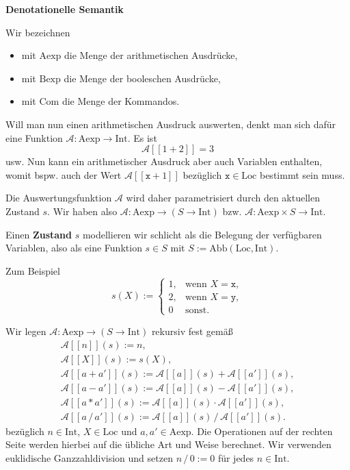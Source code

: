 \documentclass[8pt,fleqn,aspectratio=169]{beamer}
\newcommand{\strong}[1]{\textsf{\textbf{#1}}}
\newcommand{\centerheadline}[1]{%
  \begin{center}\strong{#1}\end{center}}
\newcommand{\parspace}{\vspace{0.8em}}
\newcommand{\code}[1]{{\texttt{#1}}}
\newcommand{\qb}[1]{[\!\![#1]\!\!]}
\newcommand{\Int}{\mathrm{Int}}
\newcommand{\Loc}{\mathrm{Loc}}
\newcommand{\Aexp}{\mathrm{Aexp}}
\newcommand{\Bexp}{\mathrm{Bexp}}
\newcommand{\Com}{\mathrm{Com}}
\newcommand{\evA}{\mathcal A}
\newcommand{\Abb}{\mathrm{Abb}}
\begin{document}
\begin{frame}
\centerheadline{Denotationelle Semantik}
\end{frame}

\begin{frame}
Wir bezeichnen
\begin{itemize}
\item mit $\Aexp$ die Menge der arithmetischen Ausdrücke,
\item mit $\Bexp$ die Menge der booleschen Ausdrücke,
\item mit $\Com$ die Menge der Kommandos.
\end{itemize}\pause
Will man nun einen arithmetischen Ausdruck auswerten, denkt
man sich dafür eine Funktion $\evA\colon\Aexp\to\Int$. Es ist
\[\evA\qb{1+2} = 3\]
usw. Nun kann ein arithmetischer Ausdruck aber auch Variablen enthalten,
womit bspw. auch der Wert $\evA\qb{\code{x}+1}$ bezüglich $\code{x}\in\Loc$
bestimmt sein muss.
\end{frame}

\begin{frame}
Die Auswertungsfunktion $\evA$ wird daher parametrisiert durch den aktuellen
Zustand $s$. Wir haben also $\evA\colon\Aexp\to (S\to\Int)$
bzw. $\evA\colon\Aexp\times S\to\Int$.\pause

\parspace
Einen \strong{Zustand} $s$ modellieren wir schlicht als die Belegung
der verfügbaren Variablen, also als eine Funktion $s\in S$ mit
$S:=\Abb(\Loc,\Int)$.\pause

\parspace
Zum Beispiel
\[s(X) := \begin{cases}
1, & \text{wenn $X=\code{x}$},\\
2, & \text{wenn $X=\code{y}$},\\
0 & \text{sonst}. 
\end{cases}\]
\end{frame}

\begin{frame}
Wir legen $\evA\colon\Aexp\to (S\to\Int)$ rekursiv fest gemäß
\begin{gather*}
\evA\qb{n}(s) := n,\\
\evA\qb{X}(s) := s(X),\\
\evA\qb{a+a'}(s) := \evA\qb{a}(s) + \evA\qb{a'}(s),\\
\evA\qb{a-a'}(s) := \evA\qb{a}(s) - \evA\qb{a'}(s),\\
\evA\qb{a*a'}(s) := \evA\qb{a}(s) \cdot \evA\qb{a'}(s),\\
\evA\qb{a\,/\,a'}(s) := \evA\qb{a}(s)\,/\, \evA\qb{a'}(s).
\end{gather*}
bezüglich $n\in\Int$, $X\in\Loc$ und $a,a'\in\Aexp$.
Die Operationen auf der rechten Seite werden hierbei auf die übliche
Art und Weise berechnet. Wir verwenden euklidische Ganzzahldivision
und setzen $n\,/\,0:=0$ für jedes $n\in\Int$.
\end{frame}
\end{document}

